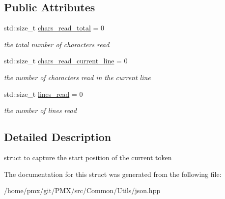 \subsection*{Public Attributes}
\begin{DoxyCompactItemize}
\item 
\mbox{\label{structnlohmann_1_1detail_1_1position__t_a94cf85cd91d478c20ae143eba906ea1a}} 
std\+::size\+\_\+t \hyperlink{structnlohmann_1_1detail_1_1position__t_a94cf85cd91d478c20ae143eba906ea1a}{chars\+\_\+read\+\_\+total} = 0
\begin{DoxyCompactList}\small\item\em the total number of characters read \end{DoxyCompactList}\item 
\mbox{\label{structnlohmann_1_1detail_1_1position__t_a74df94563dd32102152ceb8c6d9041d8}} 
std\+::size\+\_\+t \hyperlink{structnlohmann_1_1detail_1_1position__t_a74df94563dd32102152ceb8c6d9041d8}{chars\+\_\+read\+\_\+current\+\_\+line} = 0
\begin{DoxyCompactList}\small\item\em the number of characters read in the current line \end{DoxyCompactList}\item 
\mbox{\label{structnlohmann_1_1detail_1_1position__t_a4bbad8bc2c0d17c1b61c3ce729908b71}} 
std\+::size\+\_\+t \hyperlink{structnlohmann_1_1detail_1_1position__t_a4bbad8bc2c0d17c1b61c3ce729908b71}{lines\+\_\+read} = 0
\begin{DoxyCompactList}\small\item\em the number of lines read \end{DoxyCompactList}\end{DoxyCompactItemize}


\subsection{Detailed Description}
struct to capture the start position of the current token 

The documentation for this struct was generated from the following file\+:\begin{DoxyCompactItemize}
\item 
/home/pmx/git/\+P\+M\+X/src/\+Common/\+Utils/json.\+hpp\end{DoxyCompactItemize}
